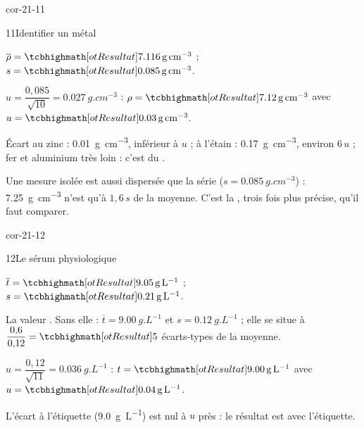 \begin{blocLivre}{cor-21-11}
\begin{corrige}{11}{Identifier un métal}
\begin{questions}
\item $\overline{\rho}=\res{\qty{7,116}{g.cm^{-3}}}$ ; $s=\res{\qty{0,085}{g.cm^{-3}}}$.
\item $u=\dfrac{0{,}085}{\sqrt{10}}=\qty{0,027}{g.cm^{-3}}$ : $\rho=\res{\qty{7,12}{g.cm^{-3}}}$ avec $u=\res{\qty{0,03}{g.cm^{-3}}}$.
\item Écart au zinc : \qty{0,01}{g.cm^{-3}}, inférieur à $u$ ; à l'étain : \qty{0,17}{g.cm^{-3}}, environ $6\,u$ ; fer et aluminium très loin : c'est
du .
\item Une mesure isolée est aussi dispersée que la série ($s=\qty{0,085}{g.cm^{-3}}$) : \qty{7,25}{g.cm^{-3}} n'est qu'à $1{,}6\,s$ de la moyenne. C'est
la , trois fois plus précise, qu'il faut comparer.
\end{questions}
\end{corrige}
\end{blocLivre}
\begin{blocLivre}{cor-21-12}
\begin{corrige}{12}{Le sérum physiologique}
\begin{questions}
\item $\overline{t}=\res{\qty{9,05}{g.L^{-1}}}$ ; $s=\res{\qty{0,21}{g.L^{-1}}}$.
\item La valeur . Sans elle : $\overline{t}=\qty{9,00}{g.L^{-1}}$ et $s=\qty{0,12}{g.L^{-1}}$ ; elle se situe à $\dfrac{0{,}6}{0{,}12}=\res{5}$ écarts-types de la moyenne.
\item $u=\dfrac{0{,}12}{\sqrt{11}}=\qty{0,036}{g.L^{-1}}$ : $t=\res{\qty{9,00}{g.L^{-1}}}$ avec $u=\res{\qty{0,04}{g.L^{-1}}}$.
\item L'écart à l'étiquette (\qty{9,0}{g.L^{-1}}) est nul à $u$ près : le résultat est  avec l'étiquette.
\end{questions}
\end{corrige}
\end{blocLivre}
